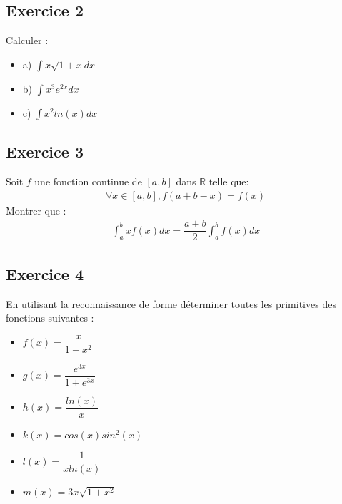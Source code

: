\documentclass[letterpaper,10pt,french]{jupyterBook}
\begin{document}
\subsection{Exercice 2}
\label{\detokenize{exoint:exercice-2}}
\sphinxAtStartPar
Calculer :
\begin{itemize}
\item {} 
\sphinxAtStartPar
a) \(\int x\sqrt{1+x}dx\)

\item {} 
\sphinxAtStartPar
b) \(\int x^3e^{2x}dx\)

\item {} 
\sphinxAtStartPar
c) \(\int x^2ln(x)dx\)

\end{itemize}


\subsection{Exercice 3}
\label{\detokenize{exoint:exercice-3}}
\sphinxAtStartPar
Soit \(f\) une fonction continue de \([a, b]\) dans \(\mathbb R\) telle que:
\begin{equation*}
\begin{split}
\forall x \in [a, b], f(a+b-x)=f(x)
\end{split}
\end{equation*}
\sphinxAtStartPar
Montrer que :
\begin{equation*}
\begin{split}
\int_a^b xf(x)dx = \dfrac{a+b}{2}\int_a^b f(x)dx
\end{split}
\end{equation*}

\subsection{Exercice 4}
\label{\detokenize{exoint:exercice-4}}
\sphinxAtStartPar
En utilisant la reconnaissance de forme déterminer toutes les primitives des fonctions suivantes :
\begin{itemize}
\item {} 
\sphinxAtStartPar
\(f(x)=\dfrac{x}{1+x^2}\)

\item {} 
\sphinxAtStartPar
\( g(x) = \dfrac{e^{3x}}{1+e^{3x}}\)

\item {} 
\sphinxAtStartPar
\(h(x) = \dfrac{ln(x)}{x}\)

\item {} 
\sphinxAtStartPar
\(k(x) = cos(x)sin^2(x)\)

\item {} 
\sphinxAtStartPar
\(l(x) = \dfrac{1}{xln(x)}\)

\item {} 
\sphinxAtStartPar
\( m(x) = 3x\sqrt{1+x^2}\)

\end{itemize}
\end{document}

